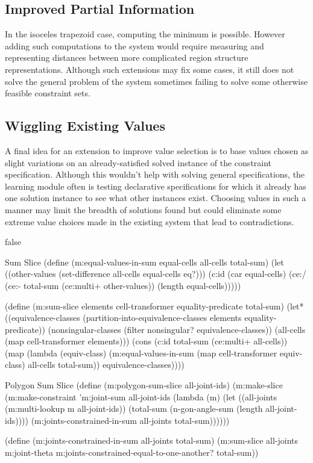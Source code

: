 \subsection{Improved Partial Information}

In the isoceles trapezoid case, computing the minimum is
possible. However adding such computations to the system would require
measuring and representing distances between more complicated region
structure representations. Although such extensions may fix some
cases, it still does not solve the general problem of the system
sometimes failing to solve some otherwise feasible constraint sets.

\subsection{Wiggling Existing Values}

A final idea for an extension to improve value selection is to base
values chosen as slight variations on an already-satisfied solved
instance of the constraint specification. Although this wouldn't help
with solving general specifications, the learning module often is
testing declarative specifications for which it already has one
solution instance to see what other instances exist. Choosing values
in such a manner may limit the breadth of solutions found but could
eliminate some extreme value choices made in the existing system that
lead to contradictions.


\if false
\begin{code-listing}
[label=sum-slice]
{Sum Slice}
(define (m:equal-values-in-sum equal-cells all-cells total-sum)
  (let ((other-values (set-difference all-cells equal-cells eq?)))
    (c:id (car equal-cells)
          (ce:/ (ce:- total-sum (ce:multi+ other-values))
                (length equal-cells)))))

(define (m:sum-slice elements cell-transformer equality-predicate total-sum)
  (let* ((equivalence-classes
          (partition-into-equivalence-classes elements equality-predicate))
         (nonsingular-classes (filter nonsingular? equivalence-classes))
         (all-cells (map cell-transformer elements)))
    (cons (c:id total-sum (ce:multi+ all-cells))
          (map (lambda (equiv-class)
                 (m:equal-values-in-sum
                  (map cell-transformer equiv-class) all-cells total-sum))
               equivalence-classes))))
\end{code-listing}

\begin{code-listing}
[label=poly-sum-slice]
{Polygon Sum Slice}
(define (m:polygon-sum-slice all-joint-ids)
  (m:make-slice
   (m:make-constraint 'm:joint-sum all-joint-ids
    (lambda (m)
      (let ((all-joints (m:multi-lookup m all-joint-ids))
            (total-sum (n-gon-angle-sum (length all-joint-ids))))
        (m:joints-constrained-in-sum all-joints total-sum))))))

(define (m:joints-constrained-in-sum all-joints total-sum)
  (m:sum-slice all-joints m:joint-theta
   m:joints-constrained-equal-to-one-another? total-sum))
\end{code-listing}


\fi
